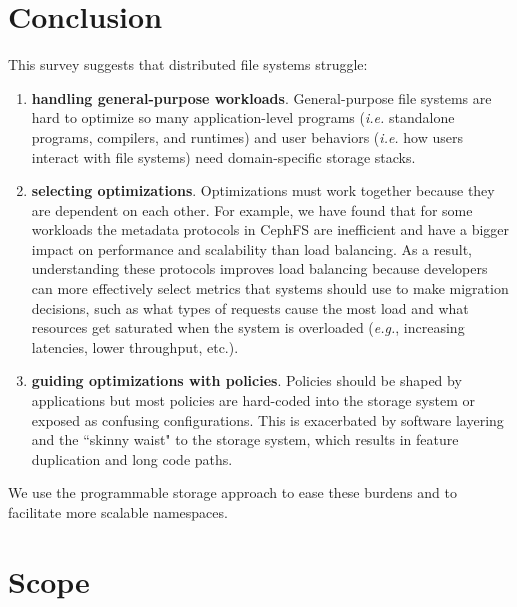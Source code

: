 \section{Conclusion}

This survey suggests that distributed file systems struggle:

\begin{enumerate}

\item \textbf{handling general-purpose workloads}. General-purpose file systems
are hard to optimize so many application-level programs ({\it i.e.} standalone
programs, compilers, and runtimes) and user behaviors ({\it i.e.} how users
interact with file systems) need domain-specific storage stacks.

\item \textbf{selecting optimizations}. Optimizations must work together
because they are dependent on each other. For example, we have found that for
some workloads the metadata protocols in CephFS are inefficient and have a
bigger impact on performance and scalability than load balancing.  As a result,
understanding these protocols improves load balancing because developers can
more effectively select metrics that systems should use to make migration
decisions, such as what types of requests cause the most load and what
resources get saturated when the system is overloaded ({\it e.g.}, increasing
latencies, lower throughput, etc.).

\item \textbf{guiding optimizations with policies}. Policies should be shaped
by applications but most policies are hard-coded into the storage system or
exposed as confusing configurations. This is exacerbated by software layering
and the ``skinny waist" to the storage system, which results in feature
duplication and long code paths.

\end{enumerate}

We use the programmable storage approach to ease these burdens and to
facilitate more scalable namespaces.

\section{Scope}

